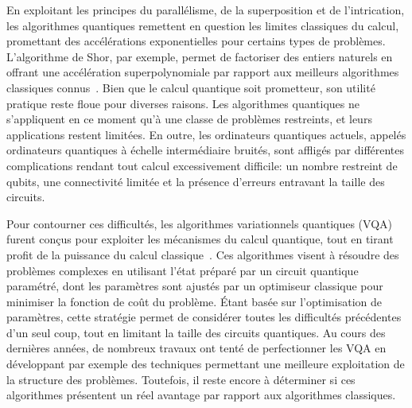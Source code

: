 \Introduction   %


En exploitant les principes du parallélisme, de la superposition et de l'intrication, les algorithmes quantiques remettent en question les limites classiques du calcul, promettant des accélérations exponentielles pour certains types de problèmes. L'algorithme de Shor, par exemple, permet de factoriser des entiers naturels en offrant une accélération superpolynomiale par rapport aux 
meilleurs algorithmes classiques connus~\cite{shorAlgorithmsQuantumComputation1994}. Bien que le calcul quantique soit prometteur, son utilité pratique reste floue pour diverses raisons. Les algorithmes quantiques ne s'appliquent en ce moment qu'à une classe de problèmes restreints, et leurs applications restent limitées. En outre, les ordinateurs quantiques actuels, appelés ordinateurs quantiques à échelle intermédiaire bruités, sont affligés par différentes complications rendant tout calcul excessivement difficile: un nombre restreint de qubits, une connectivité limitée et la présence d'erreurs entravant la taille des circuits.

Pour contourner ces difficultés, les algorithmes variationnels quantiques (VQA) furent conçus pour exploiter les mécanismes du calcul quantique, tout en tirant profit de la puissance du calcul classique~\cite{cerezoVariationalQuantumAlgorithms2021}. Ces algorithmes visent à résoudre des problèmes complexes en utilisant l'état préparé par un circuit quantique paramétré, dont les paramètres sont ajustés par un optimiseur classique pour minimiser la fonction de coût du problème. Étant basée sur l'optimisation de paramètres, cette stratégie permet de considérer toutes les difficultés précédentes d'un seul coup, tout en limitant la taille des circuits quantiques. Au cours des dernières années, de nombreux travaux ont tenté de perfectionner les VQA en développant par exemple des techniques permettant une meilleure exploitation de la structure des problèmes. Toutefois, il reste encore à déterminer si ces algorithmes présentent un réel avantage par rapport aux algorithmes classiques.  

